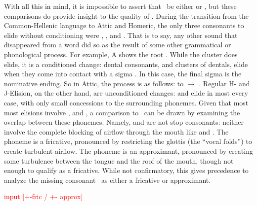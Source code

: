 With all this in mind, it is impossible to assert that \w\ be either  or , but these comparisons do provide insight to the quality of \w. During the transition from the Common-Hellenic language to Attic and Homeric, the only three consonants to elide without conditioning were , , and \w. That is to say, any other sound that disappeared from a word did so as the result of some other grammatical or phonological process. For example, A  shows the root . While the cluster  does elide, it is a conditioned change: dental consonants, and clusters of dentals, elide when they come into contact with a sigma . In this case, the final sigma  is the nominative ending.  So in Attic, the process is as follows:  to  $\to$ . Regular H- and J-Elision, on the other hand, are unconditioned changes:  and  elide in most every case, with only small concessions to the surrounding phonemes. Given that most most elisions involve , and , a comparison to \w\ can be drawn by examining the overlap between these phonemes. Namely,  and  are not stop consonants: neither involve the complete blocking of airflow through the mouth like  and . The phoneme  is a fricative, pronounced by restricting the glottis (the ``vocal folds'') to create turbulent airflow. The phoneme  is an approximant, pronounced by creating some turbulence between the tongue and the roof of the mouth, though not enough to qualify as a fricative. While not confirmatory, this gives precedence to analyze the missing consonant \w\ as either a fricative or approximant.

\noindent\textcolor{red}{input [+-fric / +- approx]}